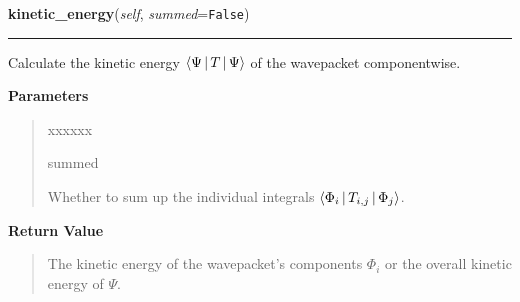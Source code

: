 \hspace{.8\funcindent}\begin{boxedminipage}{\funcwidth}

    \raggedright \textbf{kinetic\_energy}(\textit{self}, \textit{summed}={\tt False})

    \vspace{-1.5ex}

    \rule{\textwidth}{0.5\fboxrule}
\setlength{\parskip}{2ex}
    Calculate the kinetic energy
    $\Braket{\Psi|T|\Psi}$
    of the wavepacket componentwise.

\setlength{\parskip}{1ex}
      \textbf{Parameters}
      \vspace{-1ex}

      \begin{quote}
        \begin{Ventry}{xxxxxx}

          \item[summed]

          Whether to sum up the individual integrals
          $\Braket{\Phi_i|T_{i,j}|\Phi_j}$.

        \end{Ventry}

      \end{quote}

      \textbf{Return Value}
    \vspace{-1ex}

      \begin{quote}
      The kinetic energy of the wavepacket's components
      $\Phi_i$ or the overall kinetic energy of
      $\Psi$.

      \end{quote}

    \end{boxedminipage}

    \label{HagedornWavepacket:HagedornWavepacket:grady}

    \vspace{0.5ex}


